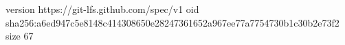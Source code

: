 version https://git-lfs.github.com/spec/v1
oid sha256:a6ed947c5e8148c414308650e28247361652a967ee77a7754730b1c30b2e73f2
size 67
